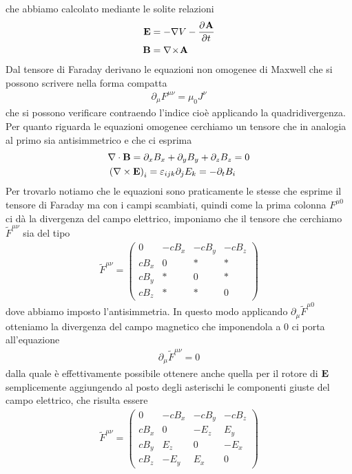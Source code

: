 che abbiamo calcolato mediante le solite relazioni
\begin{align}
  \mathbf{E} &= -\nabla V - \frac{\partial^{} {\mathbf{A}}}{\partial {t}^{}} 
  \\
  \mathbf{B} &= \nabla\!\times\!\mathbf{ A }
\end{align}
Dal tensore di Faraday derivano le equazioni non omogenee di Maxwell che si possono scrivere nella forma compatta
\begin{align}
  \partial_\mu F^{\mu \nu} = \mu_0 J^\nu
\end{align}
che si possono verificare contraendo l'indice cioè applicando la quadridivergenza. Per quanto riguarda le equazioni omogenee cerchiamo un 
tensore che in analogia al primo sia antisimmetrico e che ci esprima
\begin{align}
  &\nabla \cdot \mathbf{B} = \partial_x B_x + \partial_y B_y + \partial_z B_z = 0
  \\
  &\left( \nabla \times \mathbf{E} \right)_i = \varepsilon_{i j k} \partial_j E_k = - \partial_t B_i
\end{align}
Per trovarlo notiamo che le equazioni sono praticamente le stesse che esprime il tensore di Faraday ma con i campi scambiati, quindi come la prima colonna 
$ F^{\mu 0} $ ci dà la divergenza del campo elettrico, imponiamo che il tensore che cerchiamo $ \tilde{F}^{\mu \nu} $ sia del tipo
\begin{align}
  \tilde{F}^{\mu \nu} = 
  \begin{pmatrix}
    0 & -c B_x & -cB_y & -cB_z \\
    c B_x & 0 & \ast & \ast \\
    c B_y & \ast & 0 & \ast \\
    c B_z & \ast & \ast & 0 
  \end{pmatrix}
\end{align}
dove abbiamo imposto l'antisimmetria. In questo modo applicando $ \partial_\mu \tilde{F}^{\mu 0} $ otteniamo la divergenza del campo magnetico che 
imponendola a $ 0 $ ci porta all'equazione
\begin{align}
  \partial_\mu \tilde{F}^{\mu \nu} = 0
\end{align}
dalla quale è effettivamente possibile ottenere anche quella per il rotore di $ \mathbf{E} $ semplicemente aggiungendo al posto degli asterischi le 
componenti giuste del campo elettrico, che risulta essere
\begin{align}
  \tilde{F}^{\mu \nu} = 
  \begin{pmatrix}
    0 & -c B_x & -cB_y & -cB_z \\
    c B_x & 0 & -E_z & E_y \\
    c B_y & E_z & 0 & -E_x \\
    c B_z & -E_y & E_x & 0 
  \end{pmatrix}
\end{align}
